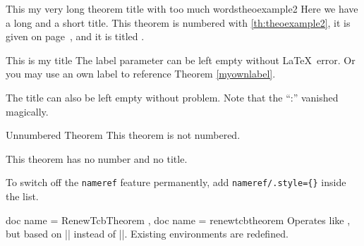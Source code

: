 \begin{docCommands}[
    doc parameter = \oarg{init options}\marg{name}\marg{display name}\marg{options}\marg{prefix},
    doc updated=2022-07-18
    ]
\begin{dispExample}
\begin{mytheo}{This my very long theorem title with
    too much words}{theoexample2}
  Here we have a long and a short title. This theorem is numbered with
  \ref{th:theoexample2}, it is given on page~\pageref{th:theoexample2},
  and it is titled \flqq{}\frqq.
\end{mytheo}
\end{dispExample}

\begin{dispExample}
\begin{mytheo}[label=myownlabel]{This is my title}{}
  The label parameter can be left empty without \LaTeX\ error.
  Or you may use an own label to reference Theorem \ref{myownlabel}.
\end{mytheo}
\end{dispExample}

\begin{dispExample}
\begin{mytheo}{}{}
  The title can also be left empty without problem. Note that the \enquote{:}
  vanished magically.
\end{mytheo}
\end{dispExample}

\begin{dispExample}
\begin{mytheo*}{Unnumbered Theorem}
  This theorem is not numbered.
\end{mytheo*}
\end{dispExample}

\begin{dispExample}
\begin{mytheo*}{}
  This theorem has no number and no title.
\end{mytheo*}
\end{dispExample}

\begin{marker}
To switch off the \texttt{nameref} feature permanently, add
\mbox{\texttt{nameref/.style=\{\}}} inside the  list.
\end{marker}

\end{docCommands}

\medskip

\begin{docCommands}[
    doc parameter = \oarg{init options}\marg{name}\marg{display name}\marg{options}\marg{prefix},
    doc updated=2022-07-18
    ]
    {
      { doc name = RenewTcbTheorem },
      { doc name = renewtcbtheorem }
    }
  Operates like , but based on |\RenewDocumentEnvironment| instead of |\NewDocumentEnvironment|.
  Existing environments are redefined.
\end{docCommands}


